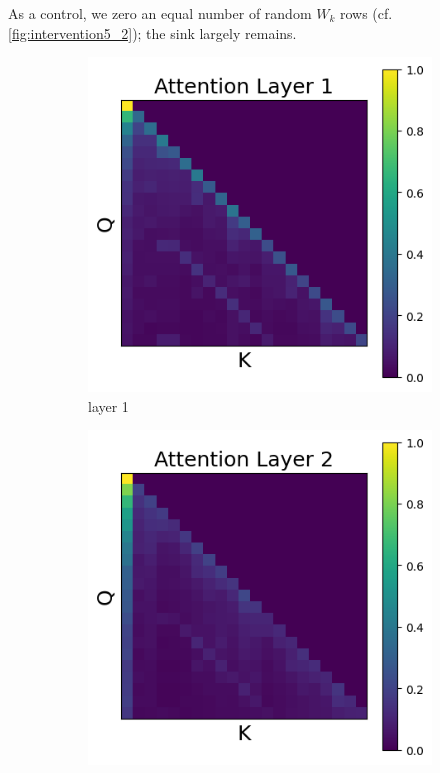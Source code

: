 \documentclass[11pt]{article}
\begin{document}
As a control, we zero an equal number of random $W_k$ rows (cf. \cref{fig:intervention5_2}); the sink largely remains.
\begin{figure}[t]
  \begin{subfigure}[t]{0.24\textwidth}
    \centering
    \includegraphics[width=1.4\columnwidth]{figures/intervention5_2/layer_1.png}
    \caption{layer 1}
  \end{subfigure}\hfill
  \begin{subfigure}[t]{0.24\textwidth}
    \centering
    \includegraphics[width=1.4\columnwidth]{figures/intervention5_2/layer_2.png}

\end{subfigure}
\end{figure}
\end{document}
